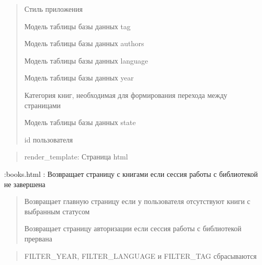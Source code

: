 \documentclass[letterpaper,10pt,russian]{sphinxmanual}
\begin{document}
\begin{fulllineitems}
\begin{description}
\begin{quote}
\begin{description}
\sphinxAtStartPar
Стиль приложения

\sphinxAtStartPar
Модель таблицы базы данных tag

\sphinxAtStartPar
Модель таблицы базы данных authors

\sphinxAtStartPar
Модель таблицы базы данных language

\sphinxAtStartPar
Модель таблицы базы данных year

\sphinxAtStartPar
Категория книг, необходимая для формирования перехода между страницами

\sphinxAtStartPar
Модель таблицы базы данных state

\sphinxAtStartPar
id пользователя

\end{description}\end{quote}

\end{description}
\begin{quote}\begin{description}
\sphinxAtStartPar
render\_template: Страница html

\end{description}\end{quote}
\begin{description}
\sphinxAtStartPar
:books.html : Возвращает страницу с книгами если сессия работы с библиотекой  не завершена
\begin{quote}\begin{description}
\sphinxAtStartPar
Возвращает главную страницу если у пользователя отсутствуют книги с выбранным статусом

\sphinxAtStartPar
Возвращает страницу авторизации если сессия работы с библиотекой прервана

\end{description}\end{quote}

\begin{quote}\begin{description}
\sphinxAtStartPar
FILTER\_YEAR, FILTER\_LANGUAGE и FILTER\_TAG сбрасываются


\end{description}
\end{quote}
\end{description}
\end{fulllineitems}
\end{document}

